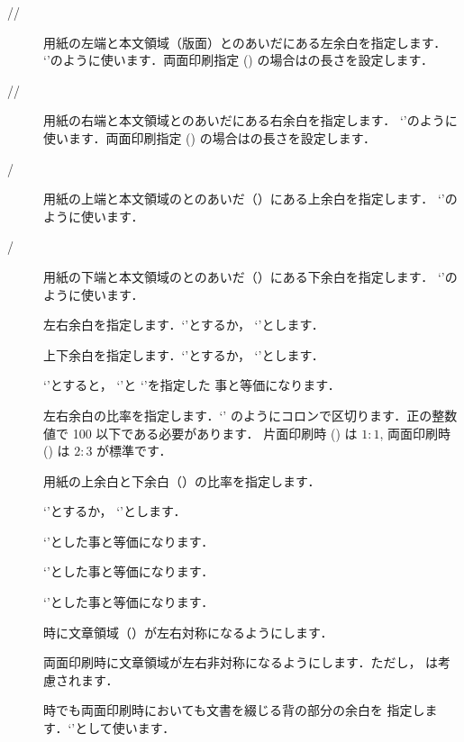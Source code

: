\begin{description}
 \item[//]
 用紙の左端と本文領域（版面）とのあいだにある左余白を指定します．
 `'のように使います．両面印刷指定
 () の場合はの長さを設定します．
 \item[//]
 用紙の右端と本文領域とのあいだにある右余白を指定します．
 `'のように使います．両面印刷指定
 () の場合はの長さを設定します．
 \item[/]
  用紙の上端と本文領域のとのあいだ（）にある上余白を指定します．
 `'のように使います．
 \item[/]
  用紙の下端と本文領域のとのあいだ（）にある下余白を指定します．
 `'のように使います．
 \item[]
  左右余白を指定します．`'とするか，
  `'とします．
 \item[]
  上下余白を指定します．`'とするか，
  `'とします．
 \item[]
  `'とすると，
  `'と
  `'を指定した
  事と等価になります．
 \item[]
  左右余白の比率を指定します．`'
  のようにコロンで区切ります．正の整数値で 100 以下である必要があります．
  片面印刷時 () は $1:1$, 両面印刷時 ()
  は $2:3$ が標準です．
  \item[]
  用紙の上余白と下余白（）の比率を指定します．
 \item[]
  `'とするか，
  `'とします．
 \item[]
  `'とした事と等価になります．
 \item[]
  `'とした事と等価になります．
 \item[]
  `'とした事と等価になります．
 \item[]
  時に文章領域（）が左右対称になるようにします．
 \item[]
  両面印刷時に文章領域が左右非対称になるようにします．ただし，
  は考慮されます．
 \item[]
  時でも両面印刷時においても文書を綴じる背の部分の余白を
  指定します．`'として使います．
\end{description}

